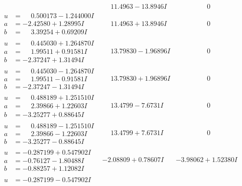 \documentclass[1p]{elsarticle_modified}
\theoremstyle{definition}
\begin{document}
$$\begin{array}{c|c|c}
 & \phantom{-}11.4963 - 13.8946 I & \phantom{-0.000000 } 0 \\ \hline\begin{aligned}
u &= \phantom{-}0.500173 - 1.244000 I \\
a &= -2.42580 + 1.28995 I \\
b &= \phantom{-}3.39254 + 0.69209 I\end{aligned}
 & \phantom{-}11.4963 + 13.8946 I & \phantom{-0.000000 } 0 \\ \hline\begin{aligned}
u &= \phantom{-}0.445030 + 1.264870 I \\
a &= \phantom{-}1.99511 + 0.91581 I \\
b &= -2.37247 + 1.31494 I\end{aligned}
 & \phantom{-}13.79830 - 1.96896 I & \phantom{-0.000000 } 0 \\ \hline\begin{aligned}
u &= \phantom{-}0.445030 - 1.264870 I \\
a &= \phantom{-}1.99511 - 0.91581 I \\
b &= -2.37247 - 1.31494 I\end{aligned}
 & \phantom{-}13.79830 + 1.96896 I & \phantom{-0.000000 } 0 \\ \hline\begin{aligned}
u &= \phantom{-}0.488189 + 1.251510 I \\
a &= \phantom{-}2.39866 + 1.22603 I \\
b &= -3.25277 + 0.88645 I\end{aligned}
 & \phantom{-}13.4799 - 7.6731 I & \phantom{-0.000000 } 0 \\ \hline\begin{aligned}
u &= \phantom{-}0.488189 - 1.251510 I \\
a &= \phantom{-}2.39866 - 1.22603 I \\
b &= -3.25277 - 0.88645 I\end{aligned}
 & \phantom{-}13.4799 + 7.6731 I & \phantom{-0.000000 } 0 \\ \hline\begin{aligned}
u &= -0.287199 + 0.547902 I \\
a &= -0.76127 - 1.80488 I \\
b &= -0.88257 + 1.12082 I\end{aligned}
 & -2.08809 + 0.78607 I & -3.98062 + 1.52380 I \\ \hline\begin{aligned}
u &= -0.287199 - 0.547902 I \\

\end{aligned}
\end{array}$$
\end{document}

